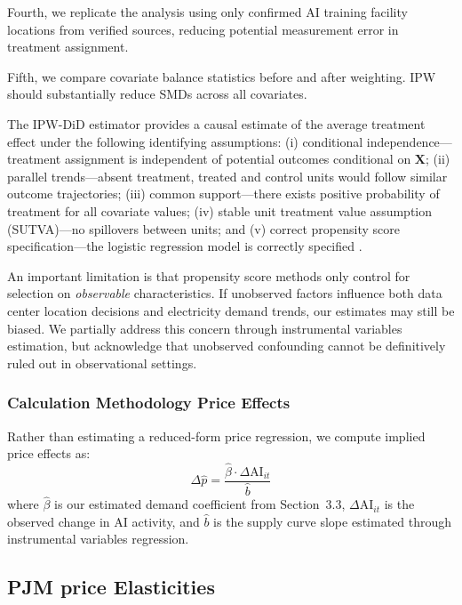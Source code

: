 \documentclass[sigconf]{acmart}
\begin{document}
Fourth, we replicate the analysis using only confirmed AI training facility locations from verified sources, reducing potential measurement error in treatment assignment.

Fifth, we compare covariate balance statistics before and after weighting. IPW should substantially reduce SMDs across all covariates.

The IPW-DiD estimator provides a causal estimate of the average treatment effect under the following identifying assumptions: (i) conditional independence---treatment assignment is independent of potential outcomes conditional on $\mathbf{X}$; (ii) parallel trends---absent treatment, treated and control units would follow similar outcome trajectories; (iii) common support---there exists positive probability of treatment for all covariate values; (iv) stable unit treatment value assumption (SUTVA)---no spillovers between units; and (v) correct propensity score specification---the logistic regression model is correctly specified \citep{abadie2005semiparametric, callaway2021difference}.

An important limitation is that propensity score methods only control for selection on \emph{observable} characteristics. If unobserved factors influence both data center location decisions and electricity demand trends, our estimates may still be biased. We partially address this concern through instrumental variables estimation, but acknowledge that unobserved confounding cannot be definitively ruled out in observational settings.


\subsubsection{Calculation Methodology Price Effects}\label{CalcMethodologyPrice}

Rather than estimating a reduced-form price regression, we compute implied price effects as:
\begin{equation}
\Delta \hat{p} = \frac{\hat{\beta} \cdot \Delta \text{AI}_{it}}{\hat{b}}
\end{equation}
where $\hat{\beta}$ is our estimated demand coefficient from Section~3.3, $\Delta \text{AI}_{it}$ is the observed change in AI activity, and $\hat{b}$ is the supply curve slope estimated through instrumental variables regression.

\subsection{PJM price Elasticities}\label{PriceElasticityAppendix}
\end{document}
